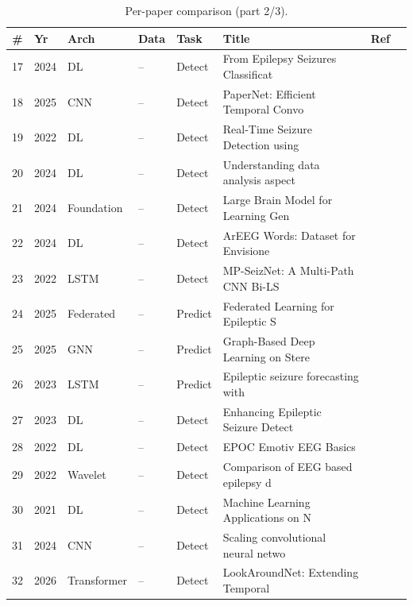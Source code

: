 \documentclass[10pt,journal,twocolumn]{IEEEtran}
\begin{document}
\begin{table}[t]\centering\caption{Per-paper comparison (part 2/3).}
\footnotesize\begin{tabular}{clllll p{2.4cm}l}\toprule \# & Yr & Arch & Data & Task & Title & Ref\\\midrule
17 & 2024 & DL & -- & Detect & From Epilepsy Seizures Classificat & \cite{ep241003385} \\
18 & 2025 & CNN & -- & Detect & PaperNet: Efficient Temporal Convo & \cite{ep251222172} \\
19 & 2022 & DL & -- & Detect & Real-Time Seizure Detection using  & \cite{ep220108780} \\
20 & 2024 & DL & -- & Detect & Understanding data analysis aspect & \cite{ep240309707} \\
21 & 2024 & Foundation & -- & Detect & Large Brain Model for Learning Gen & \cite{ep240518765} \\
22 & 2024 & DL & -- & Detect & ArEEG Words: Dataset for Envisione & \cite{ep241118888} \\
23 & 2022 & LSTM & -- & Detect & MP-SeizNet: A Multi-Path CNN Bi-LS & \cite{ep221104628} \\
24 & 2025 & Federated & -- & Predict & Federated Learning for Epileptic S & \cite{ep250808159} \\
25 & 2025 & GNN & -- & Predict & Graph-Based Deep Learning on Stere & \cite{ep250215198} \\
26 & 2023 & LSTM & -- & Predict & Epileptic seizure forecasting with & \cite{ep230909471} \\
27 & 2023 & DL & -- & Detect & Enhancing Epileptic Seizure Detect & \cite{ep231018767} \\
28 & 2022 & DL & -- & Detect & EPOC Emotiv EEG Basics & \cite{ep220609051} \\
29 & 2022 & Wavelet & -- & Detect & Comparison of EEG based epilepsy d & \cite{ep220404488} \\
30 & 2021 & DL & -- & Detect & Machine Learning Applications on N & \cite{ep210203336} \\
31 & 2024 & CNN & -- & Detect & Scaling convolutional neural netwo & \cite{ep240509911} \\
32 & 2026 & Transformer & -- & Detect & LookAroundNet: Extending Temporal  & \cite{ep260106016} \\
\bottomrule\end{tabular}\end{table}
\end{document}
